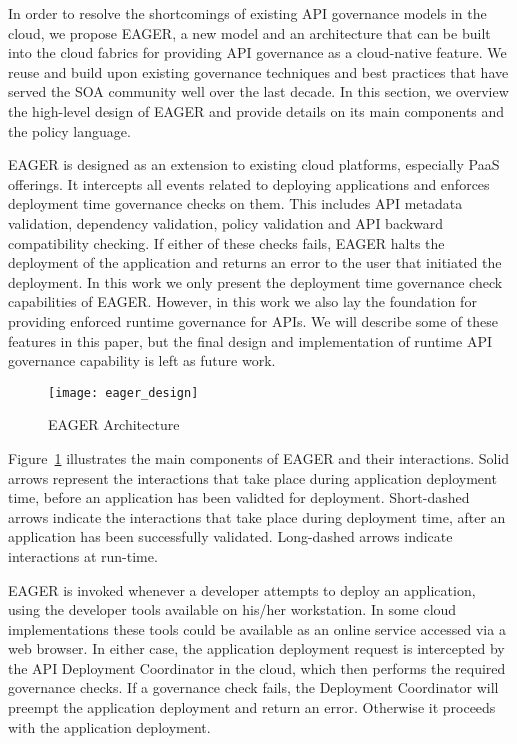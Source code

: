 In order to resolve the shortcomings of existing API governance models in the cloud, we propose EAGER, a new model and an architecture
that can be built into the cloud fabrics for providing API governance as a cloud-native feature. We reuse and build upon existing governance
techniques and best practices that have served the SOA community well over the last decade. In this section, we overview the high-level
design of EAGER and provide details on its main components and the policy language.

EAGER is designed as an extension to existing cloud platforms, especially PaaS offerings. It intercepts all events related to deploying applications
and enforces deployment time governance checks on them. This includes API metadata validation, dependency validation, policy validation and 
API backward compatibility
checking. If either of these checks fails, EAGER halts the deployment of the application and returns an error to the user that initiated the deployment.
In this work we only present the deployment time governance check capabilities of EAGER. However, in this work we also lay the foundation for
providing enforced runtime governance for APIs. We will describe some of these features in this paper, but the final design and implementation of
runtime API governance capability is left as future work.

\begin{figure}
\centering
\texttt{[image: eager\_design]}
\caption{EAGER Architecture}
\label{fig:eager_design}
\end{figure}

Figure~\ref{fig:eager_design} illustrates the main components of EAGER and their interactions. Solid arrows represent the interactions that take
place during application deployment time, before an application has been validted for deployment. Short-dashed arrows indicate
the interactions that take place during deployment time, after an application has been successfully validated. Long-dashed arrows indicate
interactions at run-time.

EAGER is invoked whenever a developer attempts to deploy an application, using the developer
tools available on his/her workstation. In some cloud implementations these tools could be available as an online service accessed 
via a web browser. In either case, the application deployment request is intercepted by the API Deployment Coordinator in the cloud, which
then performs the required governance checks. If a governance check fails, the Deployment Coordinator
will preempt the application deployment and return an error. Otherwise it proceeds with the application deployment.


